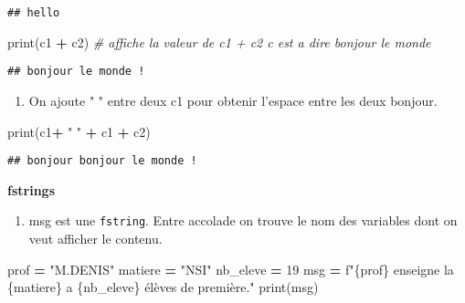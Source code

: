 \documentclass[
]{book}
\newenvironment{Shaded}{\begin{snugshade}}{\end{snugshade}}
\newcommand{\BuiltInTok}[1]{#1}
\newcommand{\CommentTok}[1]{\textcolor[rgb]{0.56,0.35,0.01}{\textit{#1}}}
\newcommand{\DecValTok}[1]{\textcolor[rgb]{0.00,0.00,0.81}{#1}}
\newcommand{\NormalTok}[1]{#1}
\newcommand{\OperatorTok}[1]{\textcolor[rgb]{0.81,0.36,0.00}{\textbf{#1}}}
\newcommand{\SpecialCharTok}[1]{\textcolor[rgb]{0.00,0.00,0.00}{#1}}
\newcommand{\SpecialStringTok}[1]{\textcolor[rgb]{0.31,0.60,0.02}{#1}}
\newcommand{\StringTok}[1]{\textcolor[rgb]{0.31,0.60,0.02}{#1}}
\providecommand{\tightlist}{%
  \setlength{\itemsep}{0pt}\setlength{\parskip}{0pt}}
\def\tightlist{}
\begin{document}
\begin{verbatim}
## hello
\end{verbatim}

\begin{Shaded}
\begin{Highlighting}[]
\BuiltInTok{print}\NormalTok{(c1 }\OperatorTok{+}\NormalTok{ c2) }\CommentTok{\# affiche la valeur de c1 + c2 c est a dire bonjour le monde}
\end{Highlighting}
\end{Shaded}

\begin{verbatim}
## bonjour le monde !
\end{verbatim}

\begin{enumerate}
\def\labelenumi{\arabic{enumi}.}
\setcounter{enumi}{2}
\tightlist
\item
  On ajoute " " entre deux c1 pour obtenir l'espace entre les deux bonjour.
\end{enumerate}

\begin{Shaded}
\begin{Highlighting}[]
\BuiltInTok{print}\NormalTok{(c1}\OperatorTok{+} \StringTok{" "} \OperatorTok{+}\NormalTok{ c1 }\OperatorTok{+}\NormalTok{ c2)}
\end{Highlighting}
\end{Shaded}

\begin{verbatim}
## bonjour bonjour le monde !
\end{verbatim}

\textbf{fstrings}

\begin{enumerate}
\def\labelenumi{\arabic{enumi}.}
\tightlist
\item
  msg est une \texttt{fstring}. Entre accolade on trouve le nom des variables dont on veut afficher le contenu.
\end{enumerate}

\begin{Shaded}
\begin{Highlighting}[]
\NormalTok{prof }\OperatorTok{=} \StringTok{"M.DENIS"}
\NormalTok{matiere }\OperatorTok{=} \StringTok{"NSI"}
\NormalTok{nb\_eleve }\OperatorTok{=} \DecValTok{19}
\NormalTok{msg }\OperatorTok{=} \SpecialStringTok{f"}\SpecialCharTok{\{}\NormalTok{prof}\SpecialCharTok{\}}\SpecialStringTok{ enseigne la }\SpecialCharTok{\{}\NormalTok{matiere}\SpecialCharTok{\}}\SpecialStringTok{ a }\SpecialCharTok{\{}\NormalTok{nb\_eleve}\SpecialCharTok{\}}\SpecialStringTok{ élèves de première."} 
\BuiltInTok{print}\NormalTok{(msg)}
\end{Highlighting}
\end{Shaded}
\end{document}
